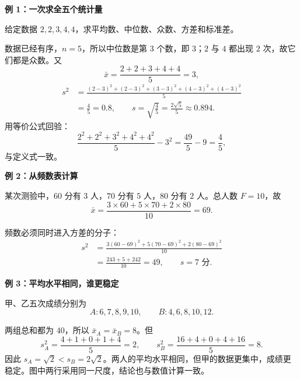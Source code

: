 \begin{examplebox}

	\textbf{\textcolor{CExample}{例 1：一次求全五个统计量}}

	给定数据 $2,2,3,4,4$，求平均数、中位数、众数、方差和标准差。

	数据已经有序，$n=5$，所以中位数是第 $3$ 个数，即 $3$；$2$ 与 $4$ 都出现 $2$ 次，故它们都是众数。又
	\[
		\bar x=\frac{2+2+3+4+4}{5}=3,
	\]
	\[
		\begin{aligned}
		s^2
		&=\frac{(2-3)^2+(2-3)^2+(3-3)^2+(4-3)^2+(4-3)^2}{5}\\
		&=\frac45=0.8,
		\qquad
		s=\sqrt{\frac45}=\frac{2\sqrt5}{5}\approx0.894.
		\end{aligned}
	\]
	用等价公式回验：
	\[
		\frac{2^2+2^2+3^2+4^2+4^2}{5}-3^2
		=\frac{49}{5}-9=\frac45,
	\]
	与定义式一致。

	\medskip
	\textbf{\textcolor{CExample}{例 2：从频数表计算}}

	某次测验中，$60$ 分有 $3$ 人，$70$ 分有 $5$ 人，$80$ 分有 $2$ 人。总人数 $F=10$，故
	\[
		\bar x=\frac{3\times60+5\times70+2\times80}{10}=69.
	\]

	

	频数必须同时进入方差的分子：
	\[
		\begin{aligned}
		s^2
		&=\frac{3(60-69)^2+5(70-69)^2+2(80-69)^2}{10}\\
		&=\frac{243+5+242}{10}=49,
		\qquad s=7\text{ 分}.
		\end{aligned}
	\]
	
	\medskip
	\textbf{\textcolor{CExample}{例 3：平均水平相同，谁更稳定}}

	甲、乙五次成绩分别为
	\[
		A:6,7,8,9,10,
		\qquad
		B:4,6,8,10,12.
	\]

	

	两组总和都为 $40$，所以 $\bar x_A=\bar x_B=8$。但
	\[
		s_A^2=\frac{4+1+0+1+4}{5}=2,
		\qquad
		s_B^2=\frac{16+4+0+4+16}{5}=8.
	\]
	因此 $s_A=\sqrt2<s_B=2\sqrt2$。两人的平均水平相同，但甲的数据更集中，成绩更稳定。图中两行采用同一尺度，结论也与数值计算一致。

\end{examplebox}
